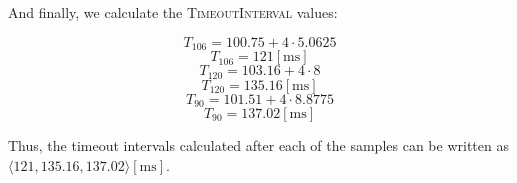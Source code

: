 \begin{enumerate}
    And finally, we calculate the \textsc{TimeoutInterval} values:

    $$T_{106}=100.75+4\cdot5.0625$$
    $$\boxed{T_{106}=121[\si{\milli\second}]}$$
    $$T_{120}=103.16+4\cdot8$$
    $$\boxed{T_{120}=135.16[\si{\milli\second}]}$$
    $$T_{90}=101.51+4\cdot 8.8775$$
    $$\boxed{T_{90}=137.02[\si{\milli\second}]}$$

    Thus, the timeout intervals calculated after each of the samples can be written as $\langle 121, 135.16, 137.02\rangle[\si{\milli\second}]$.

\end{enumerate}



